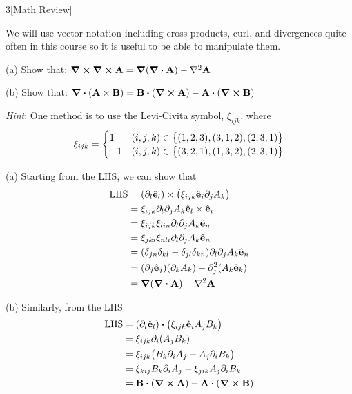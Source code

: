 \documentclass[12pt]{article}
\begin{document}
\begin{problem}{3}[Math Review]

We will use vector notation including cross products, curl, and divergences
quite often in this course so it is useful to be able to manipulate them.

(a) Show that: $\curl{\curl{\vb{A}}}=\grad(\div{\vb{A}})-\laplacian{\vb{A}}$

(b) Show that:
$\div{\qty(\vb{A}\times\vb{B})}=\vb{B}\vdot\qty(\curl{\vb{A}})-\vb{A}\vdot\qty(\curl{\vb{B}})$

\textit{Hint}: One method is to use the Levi-Civita symbol, $\xi_{ijk}$, where
\begin{equation}
    \xi_{ijk}=\begin{cases}
        1&(i,j,k)\in\qty{(1,2,3),(3,1,2),(2,3,1)}\\
        -1&(i,j,k)\in\qty{(3,2,1),(1,3,2),(2,3,1)}
    \end{cases}
\end{equation}

\begin{solution}
    (a) Starting from the LHS, we can show that
    \begin{align}
        \text{LHS}
        &=\qty(\partial_l\hat{\vb{e}}_l)\times
            \qty(\xi_{ijk}\hat{\vb{e}}_i\partial_jA_k)\notag\\
        &=\xi_{ijk}\partial_l\partial_jA_k\hat{\vb{e}}_l\times\hat{\vb{e}}_i
            \notag\\
        &=\xi_{ijk}\xi_{lin}\partial_l\partial_jA_k\hat{\vb{e}}_n\notag\\
        &=\xi_{jki}\xi_{nli}\partial_l\partial_jA_k\hat{\vb{e}}_n\notag\\
        &=(\delta_{jn}\delta_{kl}-\delta_{jl}\delta_{kn})\partial_l\partial_j
            A_k\hat{\vb{e}}_n\notag\\
        &=(\partial_j\hat{\vb{e}}_j)(\partial_kA_k)
            -\partial_j^2(A_k\hat{\vb{e}}_k)\notag\\
        &=\grad(\div{\vb{A}})-\laplacian{\vb{A}}
    \end{align}

    (b) Similarly, from the LHS
    \begin{align}
        \text{LHS}
        &=\qty(\partial_l\hat{\vb{e}}_l)\vdot
            \qty(\xi_{ijk}\hat{\vb{e}}_iA_jB_k)\notag\\
        &=\xi_{ijk}\partial_i(A_jB_k)\notag\\
        &=\xi_{ijk}\qty(B_k\partial_iA_j+A_j\partial_iB_k)\notag\\
        &=\xi_{kij}B_k\partial_iA_j-\xi_{jik}A_j\partial_iB_k\notag\\
        &=\vb{B}\vdot\qty(\curl{\vb{A}})-\vb{A}\vdot\qty(\curl{\vb{B}})
    \end{align}
\end{solution}

\end{problem}
\end{document}
